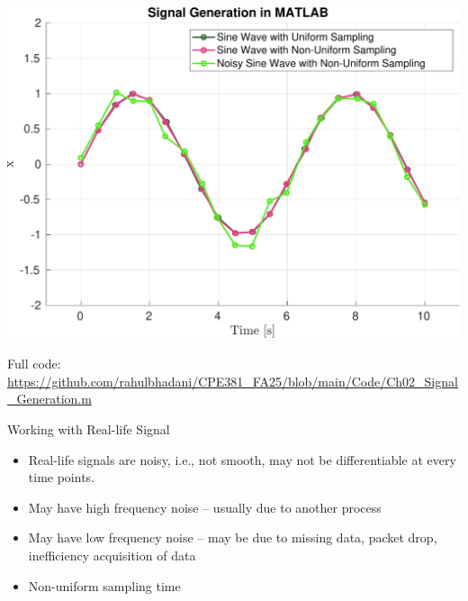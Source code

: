 \documentclass[aspectratio=169,xcolor=dvipsnames,svgnames,x11names,fleqn]{beamer}
\begin{document}
\begin{frame}{}

\begin{center}
\includegraphics[width=0.6\linewidth]{../Code/figures/Ch02_signal_generation.pdf}

\footnotesize Full code: \url{https://github.com/rahulbhadani/CPE381_FA25/blob/main/Code/Ch02_Signal_Generation.m}
\end{center}

\end{frame}

\begin{frame}{Working with Real-life Signal}

\begin{itemize}
\item Real-life signals are noisy, i.e., not smooth, may not be differentiable at every time points.
\item May have high frequency noise -- usually due to another process 
\item May have low frequency noise -- may be due to missing data, packet drop, inefficiency acquisition of data
\item Non-uniform sampling time
\end{itemize}

\end{frame}
\end{document}
